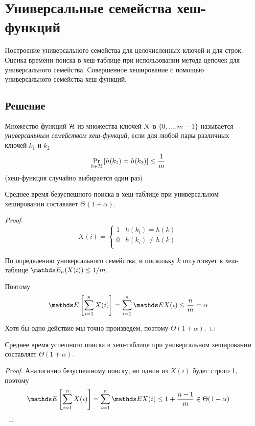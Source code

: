 \section{Универсальные семейства хеш-функций}
Построение универсального семейства для
целочисленных ключей и для строк.
Оценка времени поиска в хеш-таблице
при использовании метода цепочек для универсального семейства.
Совершенное хеширование с помощью
универсального семейства хеш-функций.

\subsection{Решение}
Множество функций $\mathcal{H}$
из множества ключей $\mathcal{K}$
в $\{0, \ldots, m - 1\}$
называется
\emph{универсальным семейством хеш-функций},
если для любой пары различных ключей
$k_1$ и $k_2$
\[ \Pr_{h \in \mathcal{H}} \left[ h(k_1) = h(k_2) \right] \le \frac{1}{m} \]
(хеш-функция случайно выбирается один раз)

\begin{theorem}
    Среднее время безуспешного поиска в хеш-таблице при
    универсальном хешировании составляет $\Theta(1 + \alpha)$.
\end{theorem}
\begin{proof}
    \[
        X(i) =
        \begin{cases}
            1 & h(k_i) = h(k) \\
            0 & h(k_i) \ne h(k) \\
        \end{cases}
    \]

    По определению универсального семейства,
    и поскольку $k$ отсутствует в хеш-таблице
    $\E_h(X(i)) \le 1 / m$.

    Поэтому
    \begin{gather*}
        \E \brackets{\sum_{i=1}^n X(i)}
        = \sum_{i=1}^n \E X(i)
        \le \frac{n}{m} = \alpha
    \end{gather*}

    Хотя бы одно действие мы точно произведём,
    поэтому $\Theta(1 + \alpha)$.
\end{proof}

\begin{theorem}
    Среднее время успешного поиска в хеш-таблице при
    универсальном хешировании составляет $\Theta(1 + \alpha)$.
\end{theorem}
\begin{proof}
    Аналогично безуспешному поиску,
    но однин из $X(i)$ будет строго 1,
    поэтому
    \begin{gather*}
        \E \brackets{\sum_{i=1}^n X(i)}
        = \sum_{i=1}^n \E X(i)
        \le 1 + \frac{n - 1}{m} \in \Theta(1 + \alpha)
    \end{gather*}
\end{proof}

